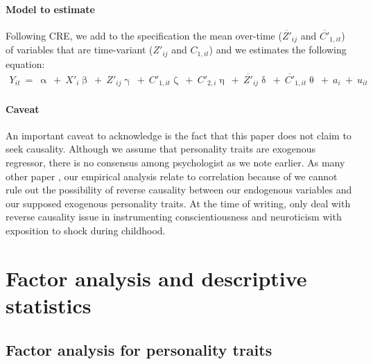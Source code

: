 \documentclass[a4paper, 11pt, onecolumn]{article}
\begin{document}
\paragraph*{Model to estimate}

Following CRE, we add to the specification the mean over-time ($\overline{Z'}_{ij}$ and $\overline{C'}_{1,it}$) of variables that are time-variant ($Z'_{ij}$ and $C_{1,it}$) and we estimates the following equation:
\begin{equation}\label{eq:CREfinal}
\begin{split}
Y_{it}~=~\upalpha~+~X'_i\upbeta~+~Z'_{ij}\upgamma~+~C'_{1,it}\upzeta~+~C'_{2,i}\upeta~+~\overline{Z'}_{ij}\updelta~+~\overline{C'}_{1,it}\uptheta~+~a_i~+~u_{it}
\end{split}
\end{equation}

\paragraph*{Caveat}
An important caveat to acknowledge is the fact that this paper does not claim to seek causality. 
Although we assume that personality traits are exogenous regressor, there is no consensus among psychologist as we note earlier.
As many other paper \citep{Brown2014, Bucciol2017, Pinjisakikool2017, Pinjisakikool2017b, CobbClark2016, Bertoni2019}, our empirical analysis relate to correlation because of we cannot rule out the possibility of reverse causality between our endogenous variables and our supposed exogenous personality traits.
At the time of writing, only \cite{Parise2019} deal with reverse causality issue in instrumenting conscientiousness and neuroticism with exposition to shock during childhood.

\newpage
\section{Factor analysis and descriptive statistics}

	\subsection{Factor analysis for personality traits} \label{subsection:factor}
\end{document}
